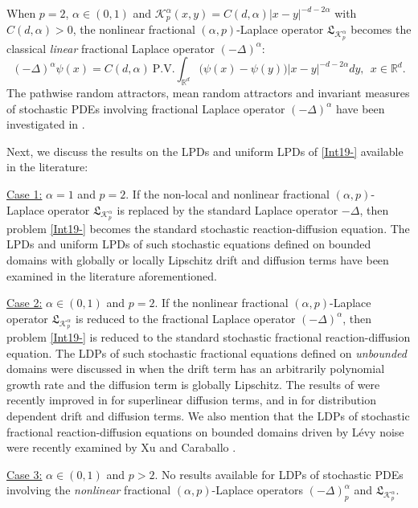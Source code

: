 \documentclass[11pt]{article}
\numberwithin{equation}{section}
\begin{document}
When $p=2$, $\alpha\in(0,1)$ and $\mathcal{K}_{p}^\alpha(x,y)
=C(d,\alpha)|x-y|^{-d-2\alpha}$ with
$C(d,\alpha)>0$, the
nonlinear fractional $(\alpha,p)$-Laplace operator
$\mathfrak{L}_{\mathcal{K}_{p}^\alpha}$ becomes the classical \emph{linear} fractional Laplace operator $(-\Delta)^\alpha$:
$$(-\Delta)^\alpha\psi(x)
=C(d,\alpha)\ \mbox{P.V.}\int_{\mathbb{R}^d}
\big(\psi(x)-\psi(y)\big)|x-y|^{-d-2\alpha }dy, \ \ x\in\mathbb{R}^d.
 $$
The pathwise random attractors, mean random attractors and invariant measures of
stochastic PDEs involving fractional Laplace operator $(-\Delta)^\alpha$ have been investigated in \cite{Chenzhang4,Gu2018jde,wangjde2019,rwang2,WangGUOWANG,Xu1}.





Next,  we discuss the  results on the   LPDs and
 uniform LPDs of \eqref{Int19-} available
 in the literature:

\underline{Case 1:} $\alpha=1$ and $p=2$. If the non-local and nonlinear fractional  $(\alpha,p)$-Laplace
operator $\mathfrak{L}_{\mathcal{K}_{p}^\alpha}$
is replaced by the standard Laplace
operator $-\Delta$, then problem \eqref{Int19-}
becomes the standard stochastic reaction-diffusion equation. The LPDs and uniform LPDs of such stochastic equations defined on bounded domains with globally or locally Lipschitz
drift and diffusion terms have been examined in the literature aforementioned.

\underline{Case 2:}
$\alpha\in(0,1)$ and $p=2$. If the nonlinear fractional $(\alpha,p)$-Laplace
operator $\mathfrak{L}_{\mathcal{K}_{p}^\alpha}$
is reduced to the fractional Laplace
operator $(-\Delta)^\alpha$, then problem \eqref{Int19-} is reduced to the standard
stochastic fractional reaction-diffusion equation. The LDPs of such stochastic fractional equations defined on \emph{unbounded} domains were discussed in \cite{wangLargedeviationsjde} when the
drift term has an arbitrarily
polynomial growth rate and the
diffusion term is globally
Lipschitz. The results of \cite{wangLargedeviationsjde} were recently
improved in \cite{Wang2024submitted} for superlinear diffusion terms, and in
\cite{Chenzhang4b} for distribution dependent drift and diffusion terms. We also mention that
the LDPs of stochastic fractional reaction-diffusion equations on bounded domains driven by L\'{e}vy noise were recently examined by Xu and Caraballo \cite{Xu2}.



\underline{Case 3:}
$\alpha\in(0,1)$ and $p>2$.
No results available for LDPs of stochastic PDEs involving the \emph{nonlinear} fractional  $(\alpha,p)$-Laplace
operators $(-\Delta)_{p}^\alpha$ and $\mathfrak{L}_{\mathcal{K}_{p}^\alpha}$.
\end{document}
